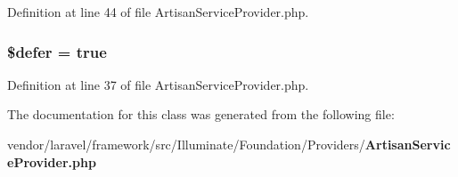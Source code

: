 Definition at line 44 of file Artisan\+Service\+Provider.\+php.

\subsubsection[{\$defer}]{\setlength{\rightskip}{0pt plus 5cm}\$defer = true\hspace{0.3cm}{\ttfamily [protected]}}\label{class_illuminate_1_1_foundation_1_1_providers_1_1_artisan_service_provider_af035ee3a0e66d50f2a013040b1d320b8}


Definition at line 37 of file Artisan\+Service\+Provider.\+php.



The documentation for this class was generated from the following file\+:\begin{DoxyCompactItemize}
\item 
vendor/laravel/framework/src/\+Illuminate/\+Foundation/\+Providers/{\bf Artisan\+Service\+Provider.\+php}\end{DoxyCompactItemize}
